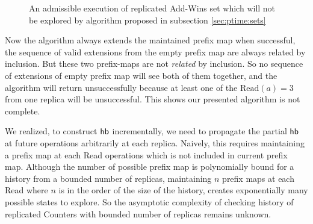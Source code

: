 \begin{figure}
\begin{minipage}{\textwidth}
      \caption{An admissible execution of replicated Add-Wins set which will not be explored by algorithm proposed in subsection \ref{sec:ptime:sets}}
      \label{correction:fig2}
  \end{minipage}
  \end{figure}

Now the algorithm always extends the maintained prefix map \ie when successful, the sequence of valid extensions from the empty prefix map are always related by inclusion. But these two prefix-maps are not \emph{related} by inclusion. So no sequence of extensions of empty prefix map will see both of them together, and the algorithm will return unsuccessfully because at least one of the $\mathrm{Read}(a) = 3$ from one replica will be unsuccessful. This shows our presented algorithm is not complete.

We realized, to construct $\textsf{hb}$ incrementally, we need to propagate the partial $\textsf{hb}$ at future operations arbitrarily at each replica. Naively, this requires maintaining a prefix map at each \textrm{Read} operations which is not included in current prefix map. Although the number of possible prefix map is polynomially bound for a history from a bounded number of replicas, maintaining $n$ prefix maps at each \textrm{Read} where $n$ is in the order of the size of the history, creates exponentially many possible states to explore. So the asymptotic complexity of checking history of replicated Counters with bounded number of replicas remains unknown.

